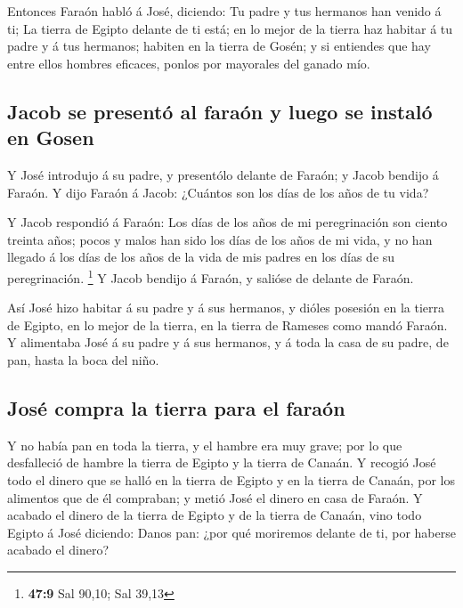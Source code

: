  Entonces Faraón habló á José, diciendo: Tu padre y tus
hermanos han venido á ti;  La tierra de Egipto delante de ti
está; en lo mejor de la tierra haz habitar á tu padre y á tus hermanos;
habiten en la tierra de Gosén; y si entiendes que hay entre ellos
hombres eficaces, ponlos por mayorales del ganado mío.

\hypertarget{jacob-se-presentuxf3-al-farauxf3n-y-luego-se-instaluxf3-en-gosen}{%
\subsection{Jacob se presentó al faraón y luego se instaló en
Gosen}\label{jacob-se-presentuxf3-al-farauxf3n-y-luego-se-instaluxf3-en-gosen}}

 Y José introdujo á su padre, y presentólo delante de
Faraón; y Jacob bendijo á Faraón.  Y dijo Faraón á Jacob:
¿Cuántos son los días de los años de tu vida?

 Y Jacob respondió á Faraón: Los días de los años de mi
peregrinación son ciento treinta años; pocos y malos han sido los días
de los años de mi vida, y no han llegado á los días de los años de la
vida de mis padres en los días de su peregrinación. \footnote{\textbf{47:9}
  Sal 90,10; Sal 39,13}  Y Jacob bendijo á Faraón, y
salióse de delante de Faraón.

 Así José hizo habitar á su padre y á sus hermanos, y
dióles posesión en la tierra de Egipto, en lo mejor de la tierra, en la
tierra de Rameses como mandó Faraón.  Y alimentaba José á
su padre y á sus hermanos, y á toda la casa de su padre, de pan, hasta
la boca del niño.

\hypertarget{josuxe9-compra-la-tierra-para-el-farauxf3n}{%
\subsection{José compra la tierra para el
faraón}\label{josuxe9-compra-la-tierra-para-el-farauxf3n}}

 Y no había pan en toda la tierra, y el hambre era muy
grave; por lo que desfalleció de hambre la tierra de Egipto y la tierra
de Canaán.  Y recogió José todo el dinero que se halló en
la tierra de Egipto y en la tierra de Canaán, por los alimentos que de
él compraban; y metió José el dinero en casa de Faraón.  Y
acabado el dinero de la tierra de Egipto y de la tierra de Canaán, vino
todo Egipto á José diciendo: Danos pan: ¿por qué moriremos delante de
ti, por haberse acabado el dinero?

